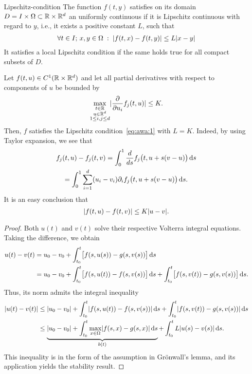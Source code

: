 \begin{Definition}{Lipschitz-condition}
  The function $f(t,y)$ satisfies on its domain $D = I\times\Omega \subset
  \mathbb R \times \mathbb R^d$ an uniformly continuous  if 
	it is Lipschitz continuous with regard to $y$, i.e., it exists a 
	positive constant $L$, such that
  \begin{gather}
    \label{eq:awa:1}
    \forall t\in I;\,x,y\in\Omega \;:\;
    \lvert f(t,x)-f(t,y)\rvert \le L \lvert x-y\rvert
  \end{gather}
  It satisfies a local Lipschitz condition if the same holds true for all 
  compact subsets of $D$.
\end{Definition}


\begin{example}
  Let $f(t,u)\in C^1(\mathbb R \times\mathbb R^d )$ and let all partial derivatives
  with respect to components of $u$ be bounded by
  \begin{gather*}
    \max_{\substack{t\in \mathbb R\\u\in \mathbb R^d\\1\le i,j \le d}}
   \lvert
     \frac{\partial}{\partial u_i} f_j(t,u)
   \rvert \le K.
  \end{gather*}
  Then, $f$ satisfies the Lipschitz condition~\eqref{eq:awa:1} with
  $L=K$. Indeed, by using Taylor expansion, we see that
  \begin{multline*}
    f_j(t, u) - f_j(t,v)
    = \int_0^1 \frac{d}{ds}f_j\bigl(t,u+s(v-u)\bigr)\,\mathrm{d} s\\
    = \int_0^1 \sum_{i=1}^d(u_i-v_i)\partial_if_j\bigl(t,u+s(v-u)\bigr)\,\mathrm{d} s.
  \end{multline*}
  It is an easy conclusion that
  \begin{gather*}
    \lvert f(t,u)-f(t,v)\rvert
    \le K \lvert u-v\rvert.
  \end{gather*}
\end{example}




\begin{proof}
  Both $u(t)$ and $v(t)$ solve their respective Volterra integral
  equations. Taking the difference, we obtain
  \begin{align*}
    u(t)-v(t) &= u_0-v_0
           + \int_{t_0}^t \bigl[ f(s,u(s)) - g(s,v(s)) \bigr]\,\mathrm{d} s
    \\
         &= u_0-v_0
           + \int_{t_0}^t \bigl[ f(s,u(t)) - f(s,v(s)) \bigr]\,\mathrm{d} s
           + \int_{t_0}^t \bigl[ f(s,v(t)) - g(s,v(s)) \bigr]\,\mathrm{d} s.
  \end{align*}
  Thus, its norm admits the integral inequality
  \begin{align*}
    \lvert u(t)-v(t)\rvert
    &\le \lvert u_0-v_0\rvert + \int_{t_0}^t\lvert f(s,u(t)) - f(s,v(s))\rvert \,\mathrm{d} s
    + \int_{t_0}^t \lvert f(s,v(t)) - g(s,v(s))\rvert \,\mathrm{d} s
    \\
    &\le \underbrace{\lvert u_0-v_0\rvert
      + \int_{t_0}^t \max_{x\in\Omega} \lvert f(s,x)-g(s,x)\rvert\,\mathrm{d} s}_{b(t)}
      + \int_{t_0}^t L \lvert u(s)-v(s)\rvert \,\mathrm{d} s.
  \end{align*}
  This inequality is in the form of the assumption in Grönwall's
  lemma, and its application yields the stability result.
\end{proof}


